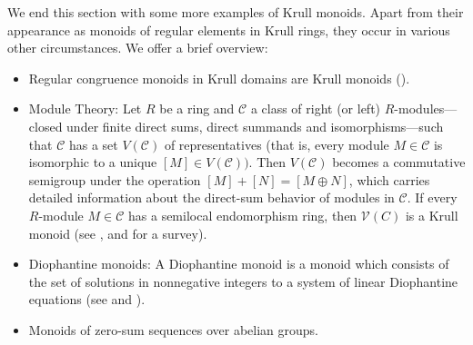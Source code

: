 \documentclass[a4paper]{amsart}
\theoremstyle{definition}
\numberwithin{equation}{section}
\begin{document}
\smallskip
We end this section with some more examples of Krull monoids.
Apart from their appearance as monoids of regular elements in Krull
rings, they occur in various other circumstances. We offer
a brief overview:
\begin{itemize}
\item Regular congruence monoids in Krull domains are Krull monoids
 (\cite[Proposition 2.11.6]{Ge-HK06a}).

\smallskip
\item Module Theory: Let $R$ be a
ring and $\mathcal C$  a class of right (or left)
$R$-modules---closed under finite direct sums, direct summands and
isomorphisms---such that $\mathcal C$ has a set $V ( \mathcal C)$ of
representatives (that is, every module $M \in \mathcal C$ is
isomorphic to a unique $[M] \in V( \mathcal C))$.  Then $V (
\mathcal C)$ becomes a commutative semigroup under the operation
$[M] + [N] = [M \oplus N]$, which carries detailed information about
the direct-sum behavior of modules in $\mathcal C$.  If every
$R$-module $M \in \mathcal C$ has a semilocal endomorphism ring,
then $\mathcal V (C)$ is a Krull monoid (see \cite{Fa02}, and
\cite{Fa06a} for a survey).

\smallskip
\item Diophantine monoids: A Diophantine monoid is a monoid which
consists of the set of solutions in nonnegative integers to a system
of linear Diophantine equations (see \cite[Proposition
4.3]{Ch-Kr-Oe02} and \cite[Theorem 2.7.14]{Ge-HK06a}).

\smallskip
\item Monoids of zero-sum sequences over abelian groups.
\end{itemize}
\end{document}
